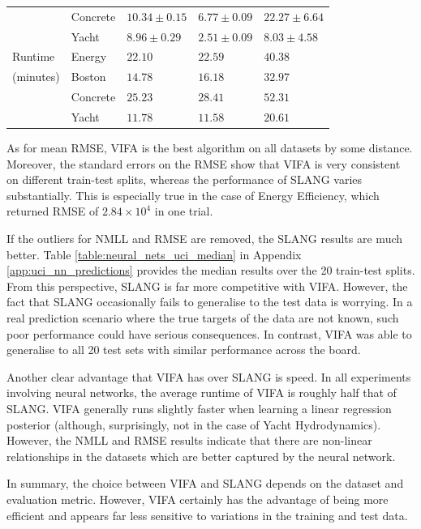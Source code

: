 \documentclass[10pt]{article} %
\begin{document}
\begin{table}[!h]
\begin{center}
\begin{tabular}{lllll}
		& Concrete  	& $10.34 \pm 0.15$ 			& $\mathbf{6.77 \pm 0.09}$ 	& $22.27 \pm 6.64$ \\ 
 	& Yacht 		& $8.96 \pm 0.29$ 			& $\mathbf{2.51 \pm 0.09}$ 	& $8.03 \pm 4.58$ \\  \hline
Runtime 	& Energy 	 	& $\mathbf{22.10}$   		& $22.59$  				& $40.38$  \\ 
(minutes)	& Boston 	 	& $\mathbf{14.78}$			& $16.18$					& $32.97$ \\ 
		& Concrete 	& $\mathbf{25.23}$			& $28.41$					& $52.31$ \\ 
 	& Yacht 		& $11.78$					& $\mathbf{11.58}$			& $20.61$\\
\end{tabular}
\end{center}
\end{table}


As for mean RMSE, VIFA is the best algorithm on all datasets by some distance.  Moreover, the standard errors on the RMSE show that VIFA is very consistent on different train-test splits, whereas the performance of SLANG varies substantially. This is especially true in the case of Energy Efficiency, which returned RMSE of $2.84 \times 10^{4}$ in one trial.

If the outliers for NMLL and RMSE are removed, the SLANG results are much better. Table \ref{table:neural_nets_uci_median} in Appendix \ref{app:uci_nn_predictions} provides the median results over the 20 train-test splits. From this perspective, SLANG is far more competitive with VIFA. However, the fact that SLANG occasionally fails to generalise to the test data is worrying. In a real prediction scenario where the true targets of the data are not known, such poor performance could have serious consequences. In contrast, VIFA was able to generalise to all 20 test sets with similar performance across the board.

Another clear advantage that VIFA has over SLANG is speed. In all experiments involving neural networks, the average runtime of VIFA is roughly half that of SLANG. VIFA generally runs slightly faster when learning a linear regression posterior (although, surprisingly, not in the case of Yacht Hydrodynamics). However, the NMLL and RMSE results indicate that there are non-linear relationships in the datasets which are better captured by the neural network. 

In summary, the choice between VIFA and SLANG depends on the dataset and evaluation metric. However, VIFA certainly has the advantage of being more efficient and appears far less sensitive to variations in the training and test data. 
\end{document}
